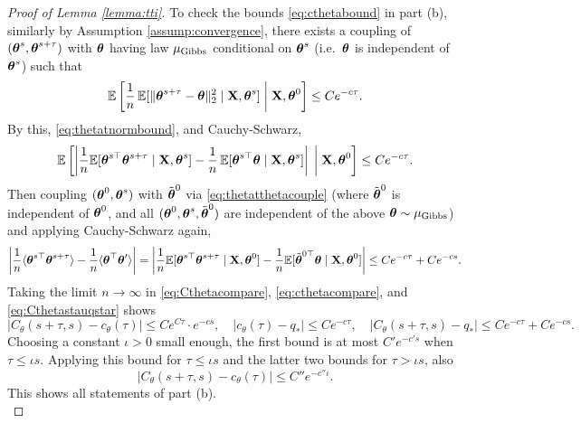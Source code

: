 \begin{proof}[Proof of Lemma \ref{lemma:tti}]
To check the bounds \eqref{eq:cthetabound} in part (b), similarly by Assumption
\ref{assump:convergence}, there exists a coupling of
$(\boldsymbol{\theta}^s,\boldsymbol{\theta}^{s+\tau})$ with $\boldsymbol{\theta}$ having law $\mu_{\mathrm{Gibbs}}$
conditional on $\boldsymbol{\theta}^s$ (i.e.\ $\boldsymbol{\theta}$ is independent of $\boldsymbol{\theta}^s$)
such that
\begin{equation}\label{eq:thetascoupling}
\mathbb{E}\left[\frac{1}{n}\,\mathbb{E}[\|\boldsymbol{\theta}^{s+\tau}-\boldsymbol{\theta}\|_2^2 \mid \mathbf{X},\boldsymbol{\theta}^s] \;\bigg|\;
\mathbf{X},\boldsymbol{\theta}^0\right]
\leq Ce^{-c\tau}.
\end{equation}
By this, \eqref{eq:thetatnormbound},
and Cauchy-Schwarz,
\[\mathbb{E}\left[\left|\frac{1}{n}\mathbb{E}[\boldsymbol{\theta}^{s\top}\boldsymbol{\theta}^{s+\tau} \mid \mathbf{X},\boldsymbol{\theta}^s]
-\frac{1}{n}\,\mathbb{E}[\boldsymbol{\theta}^{s\top} \boldsymbol{\theta} \mid \mathbf{X},\boldsymbol{\theta}^s]\right| \;\bigg|\; \mathbf{X},\boldsymbol{\theta}^0\right]
\leq Ce^{-c\tau}.\]
Then coupling $(\boldsymbol{\theta}^0,\boldsymbol{\theta}^s)$ with $\tilde {\boldsymbol{\theta}}^0$ via
\eqref{eq:thetatthetacouple} (where $\tilde{\boldsymbol{\theta}}^0$ is independent of
$\boldsymbol{\theta}^0$, and all $(\boldsymbol{\theta}^0,\boldsymbol{\theta}^s,\tilde {\boldsymbol{\theta}}^0)$ are
independent of the above $\boldsymbol{\theta} \sim \mu_{\mathrm{Gibbs}}$)
and applying Cauchy-Schwarz again,
\begin{equation}\label{eq:Cthetastauqstar}
\left|\frac{1}{n} \langle \boldsymbol{\theta}^{s\top}\boldsymbol{\theta}^{s+\tau} \rangle
-\frac{1}{n}\langle \boldsymbol{\theta}^\top \boldsymbol{\theta}' \rangle\right|
=\left|\frac{1}{n}\mathbb{E}[\boldsymbol{\theta}^{s\top}\boldsymbol{\theta}^{s+\tau} \mid \mathbf{X},\boldsymbol{\theta}^0]
-\frac{1}{n}\mathbb{E}[\tilde {\boldsymbol{\theta}}^{0\top} \boldsymbol{\theta} \mid \mathbf{X},\boldsymbol{\theta}^0]\right|
\leq Ce^{-c\tau}+Ce^{-cs}.
\end{equation}
Taking the limit $n \to \infty$ in \eqref{eq:Cthetacompare},
\eqref{eq:cthetacompare}, and \eqref{eq:Cthetastauqstar} shows
\[|C_\theta(s+\tau,s)-c_\theta(\tau)| \leq Ce^{C\tau} \cdot e^{-cs},
\quad |c_\theta(\tau)-q_*| \leq Ce^{-c\tau},
\quad |C_\theta(s+\tau,s)-q_*| \leq Ce^{-c\tau}+Ce^{-cs}.\]
Choosing a constant $\iota>0$ small enough, the first bound is at most
$C'e^{-c's}$ when $\tau \leq \iota s$. Applying this bound for $\tau
\leq \iota s$ and the latter two bounds for $\tau>\iota s$, also
\[|C_\theta(s+\tau,s)-c_\theta(\tau)| \leq C''e^{-c''\iota}.\]
This shows all statements of part (b).\\


\end{proof}
